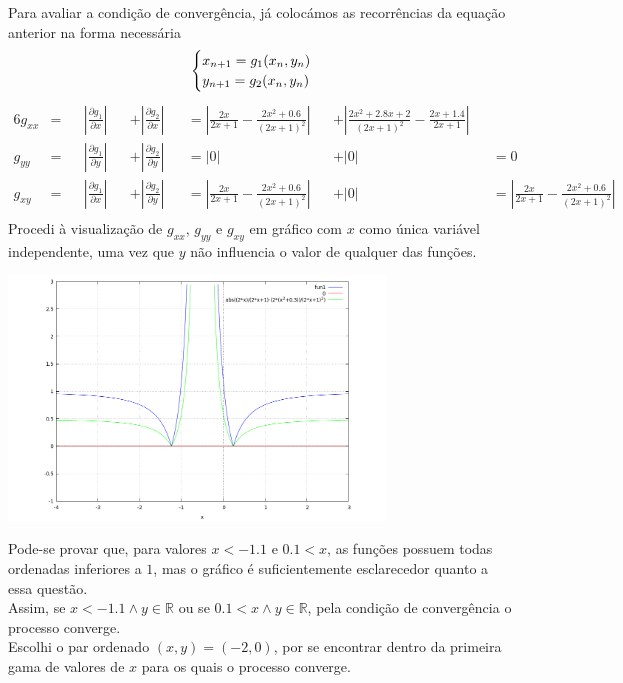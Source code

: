 Para avaliar a condição de convergência, já colocámos as recorrências da equação anterior na forma necessária
\begin{equation*}
	\begin{cases}
		x_{n+1}=g_1(x_n,y_n)\\
		y_{n+1}=g_2(x_n,y_n)
	\end{cases}\\
\end{equation*}
\begin{alignat*}{6}
	g_{xx}
	&=&&\left|\frac{\partial g_1}{\partial x}\right|&&+\left|\frac{\partial g_2}{\partial x}\right|
	&&=\left|\frac{2x}{2x+1}-\frac{2x^2+0.6}{(2x+1)^2}\right|&&+\left|\frac{2x^2+2.8x+2}{(2x+1)^2}-\frac{2x+1.4}{2x+1}\right|\\
	g_{yy}
	&=&&\left|\frac{\partial g_1}{\partial y}\right|&&+\left|\frac{\partial g_2}{\partial y}\right|
	&&=\left|0\right|&&+\left|0\right|
	&&=0\\
	g_{xy}
	&=&&\left|\frac{\partial g_1}{\partial x}\right|&&+\left|\frac{\partial g_2}{\partial y}\right|
	&&=\left|\frac{2x}{2x+1}-\frac{2x^2+0.6}{(2x+1)^2}\right|&&+\left|0\right|
	&&=\left|\frac{2x}{2x+1}-\frac{2x^2+0.6}{(2x+1)^2}\right|\\
\end{alignat*}
Procedi à visualização de $g_{xx}$, $g_{yy}$ e $g_{xy}$ em gráfico com $x$ como única variável independente, uma vez que $y$ não influencia o valor de qualquer das funções.
\begin{center} \includegraphics[height=65mm,keepaspectratio]{plots2016T1-3c} \end{center}
Pode-se provar que, para valores $x<-1.1$ e $0.1<x$, as funções possuem todas ordenadas inferiores a $1$, mas o gráfico é suficientemente esclarecedor quanto a essa questão.\\
Assim, se $x<-1.1\wedge y\in\mathbb{R}$ ou se $0.1<x \wedge y\in\mathbb{R}$, pela condição de convergência o processo converge.\\
Escolhi o par ordenado $(x,y)=(-2,0)$, por se encontrar dentro da primeira gama de valores de $x$ para os quais o processo converge.\\

